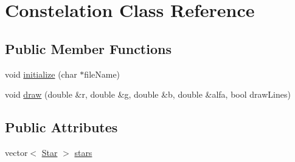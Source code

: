 \hypertarget{classConstelation}{\section{Constelation Class Reference}
\label{classConstelation}
}
\subsection*{Public Member Functions}
\begin{DoxyCompactItemize}
\item 
void \hyperlink{classConstelation_a67e8f8db581831ce96b9002250547784}{initialize} (char $\ast$file\-Name)
\item 
void \hyperlink{classConstelation_ae35262da5bcbf0123eb568f512aa45e8}{draw} (double \&r, double \&g, double \&b, double \&alfa, bool draw\-Lines)
\end{DoxyCompactItemize}
\subsection*{Public Attributes}
\begin{DoxyCompactItemize}
\item 
vector$<$ \hyperlink{classStar}{Star} $>$ \hyperlink{classConstelation_a71d208ee2a6b57c32f28044ee7acad55}{stars}
\end{DoxyCompactItemize}


